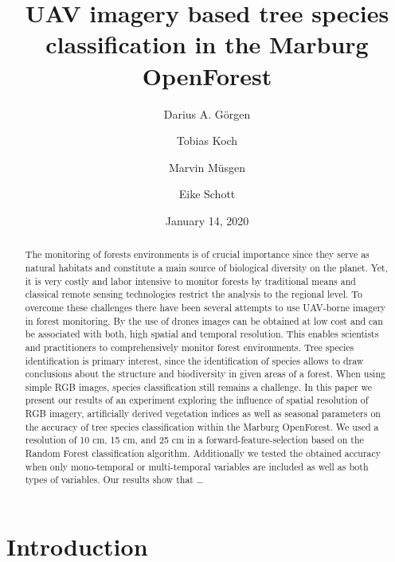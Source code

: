 \documentclass[]{article}
\title{UAV imagery based tree species classification in the Marburg OpenForest}
\author{Darius A. Görgen \and Tobias Koch \and Marvin Müsgen \and Eike Schott}
\date{January 14, 2020}
\begin{document}
\maketitle
\begin{abstract}
The monitoring of forests environments is of crucial importance since
they serve as natural habitats and constitute a main source of
biological diversity on the planet. Yet, it is very costly and labor
intensive to monitor forests by traditional means and classical remote
sensing technologies restrict the analysis to the regional level. To
overcome these challenges there have been several attempts to use
UAV-borne imagery in forest monitoring. By the use of drones images can
be obtained at low cost and can be associated with both, high spatial
and temporal resolution. This enables scientists and practitioners to
comprehensively monitor forest environments. Tree species identification
is primary interest, since the identification of species allows to draw
conclusions about the structure and biodiversity in given areas of a
forest. When using simple RGB images, species classification still
remains a challenge. In this paper we present our results of an
experiment exploring the influence of spatial resolution of RGB imagery,
artificially derived vegetation indices as well as seasonal parameters
on the accuracy of tree species classification within the Marburg
OpenForest. We used a resolution of 10 cm, 15 cm, and 25 cm in a
forward-feature-selection based on the Random Forest classification
algorithm. Additionally we tested the obtained accuracy when only
mono-temporal or multi-temporal variables are included as well as both
types of variables. Our results show that \ldots{}
\end{abstract}

{
\setcounter{tocdepth}{2}
\tableofcontents
}
\hypertarget{introduction}{%
\section{Introduction}\label{introduction}}
\end{document}
